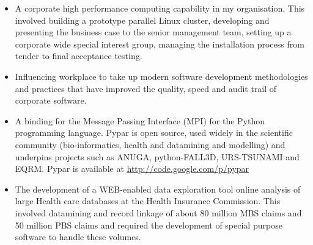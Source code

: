 \documentclass[11pt,a4paper]{article}
\begin{document}
\begin{itemize}
  \item A corporate high performance computing capability in my organisation.
  This involved building a prototype parallel Linux cluster, developing and presenting the business case to the
  senior management team, setting up a corporate wide special interest group, managing the installation process
  from tender to final acceptance testing.
  \item Influencing workplace to take up modern software development methodologies and practices that have improved the quality, speed and audit trail of corporate software.
  \item A binding for the Message Passing Interface (MPI) for the Python programming language.
  Pypar is open source, used widely in the scientific community (bio-informatics, health and datamining and modelling) and underpins projects such as ANUGA, python-FALL3D, URS-TSUNAMI and EQRM.
  Pypar is available at \url{http://code.google.com/p/pypar}
  \item The development of a WEB-enabled
  data exploration tool online analysis of large Health care databases
  at the Health Insurance Commission. This involved datamining and record linkage of about 80 million
  MBS claims and 50 million PBS claims and required the development of special purpose software to
  handle these volumes.

\end{itemize}
\end{document}
